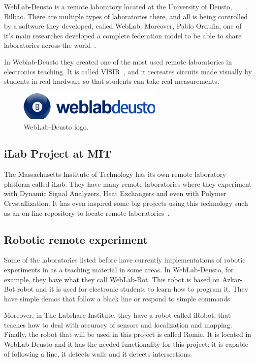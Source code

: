 WebLab-Deusto is a remote laboratory located at the University of Deusto, Bilbao. There are multiple
types of laboratories there, and all is being controlled by a software they developed, called
WebLab. Moreover, Pablo Orduña, one of it's main researches developed a complete federation model
to be able to share laboratories across the world~\cite{porduna_phd}.


In Weblab-Deusto they created one of the most used remote laboratories in electronics teaching. It
is called VISIR~\cite{visir}, and it recreates circuits made visually by students in real hardware
so that students can take real measurements.

\begin{figure}[h]
	\centering
	\includegraphics[width=.4\textwidth]{fig/weblab}
	\caption{WebLab-Deusto logo.}
\end{figure}

\subsection{iLab Project at MIT}

The Massachusetts Institute of Technology has its own remote laboratory platform called iLab. They
have many remote laboratories where they experiment with Dynamic Signal Analyzers, Heat Exchangers
and even with Polymer Crystallization. It has even inspired some big projects using this technology
such as an on-line repository to locate remote laboratories~\cite{ilabs_multi}.

\subsection{Robotic remote experiment}

Some of the laboratories listed before have currently implementations of robotic experiments in
as a teaching material in some areas. In WebLab-Deusto, for example, they have what they call
WebLab-Bot. This robot is based on Azkar-Bot robot and it is used for electronic students to learn
how to program it. They have simple demos that follow a black line or respond to simple commands.


Moreover, in The Labshare Institute, they have a robot called iRobot, that teaches how to deal with
accuracy of sensors and localization and mapping. Finally, the robot that will be used in this
project is called Romie. It is located in WebLab-Deusto and it has the needed functionality for this
project: it is capable of following a line, it detects walls and it detects intersections.


